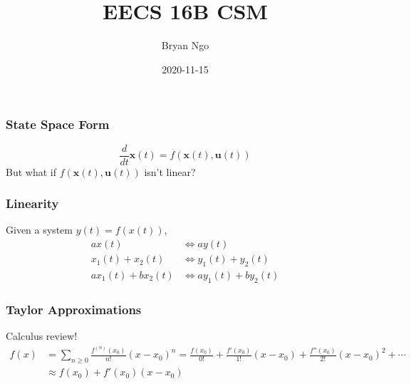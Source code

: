\documentclass[aspectratio=169]{beamer}
\title{EECS 16B CSM}
\author{Bryan Ngo}
\date{2020-11-15}
\institute{UC Berkeley}
\newcommand{\diff}[1]{\frac{d}{d #1}}
\begin{document}
\begin{frame}
    \maketitle
\end{frame}

\begin{frame}
    \frametitle{State Space Form}

    \begin{equation}
        \diff{t} \bm{x}(t) = f(\bm{x}(t), \bm{u}(t))
    \end{equation}
    But what if \(f(\bm{x}(t), \bm{u}(t))\) isn't linear?
\end{frame}

\begin{frame}
    \frametitle{Linearity}

    Given a system \(y(t) = f(x(t))\),
    \begin{align}
        a x(t) &\iff a y(t) \\
        x_1(t) + x_2(t) &\iff y_1(t) + y_2(t) \\
        a x_1(t) + b x_2(t) &\iff a y_1(t) + b y_2(t)
    \end{align}
\end{frame}

\begin{frame}
    \frametitle{Taylor Approximations}

    Calculus review!
    \begin{align}
        f(x) &= \sum_{n \geqslant 0} \frac{f^{(n)}(x_0)}{n!} (x - x_0)^n = \frac{f(x_0)}{0!} + \frac{f'(x_0)}{1!} (x - x_0) + \frac{f''(x_0)}{2!} (x - x_0)^2 + \cdots \\
        &\approx f(x_0) + f'(x_0) (x - x_0)
    \end{align}
\end{frame}
\end{document}
